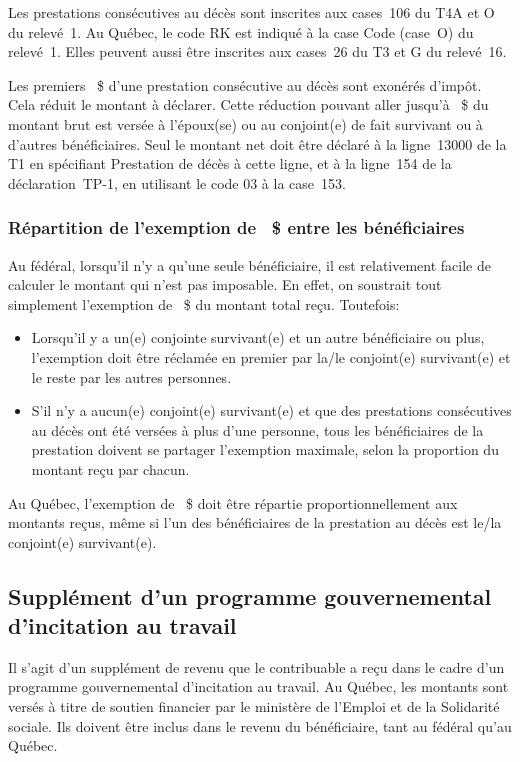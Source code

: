 Les prestations consécutives au décès sont inscrites aux cases~106 du T4A et O du relevé~1. Au Québec, le code \og RK \fg{} est indiqué à la case Code (case~O) du relevé~1. Elles peuvent aussi être inscrites aux cases~26 du T3 et G du relevé~16.

Les premiers ~\$ d'une prestation consécutive au décès sont exonérés d'impôt. Cela réduit le montant à déclarer. Cette réduction pouvant aller jusqu'à ~\$ du montant brut est versée à l'époux(se) ou au conjoint(e) de fait survivant ou à d'autres bénéficiaires. Seul le montant net doit être déclaré à la ligne~13000 de la T1 en spécifiant \og Prestation de décès \fg{} à cette ligne, et à la ligne~154 de la déclaration~TP-1, en utilisant le code 03 à la case~153. 

\subsubsection{Répartition de l'exemption de ~\$ entre les bénéficiaires}
Au fédéral, lorsqu'il n'y a qu'une seule bénéficiaire, il est relativement facile de calculer le montant qui n'est pas imposable. En effet, on soustrait tout simplement l'exemption de ~\$ du montant total reçu. Toutefois:

\begin{itemize}
	\item Lorsqu'il y a un(e) conjointe survivant(e) et un autre bénéficiaire ou plus, l'exemption doit être réclamée en premier par la/le conjoint(e) survivant(e) et le reste par les autres personnes.
	\item S'il n'y a aucun(e) conjoint(e) survivant(e) et que des prestations consécutives au décès ont été versées à plus d'une personne, tous les bénéficiaires de la prestation doivent se partager l'exemption maximale, selon la proportion du montant reçu par chacun.
\end{itemize}

Au Québec, l'exemption de ~\$ doit être répartie proportionnellement aux montants reçus, même si l'un des bénéficiaires de la prestation au décès est le/la conjoint(e) survivant(e).


\subsection{Supplément d'un programme gouvernemental d'incitation au travail}
Il s'agit d'un supplément de revenu que le contribuable a reçu dans le cadre d'un programme gouvernemental d'incitation au travail. Au Québec, les montants sont versés à titre de soutien financier par le ministère de l'Emploi et de la Solidarité sociale. Ils doivent être inclus dans le revenu du bénéficiaire, tant au fédéral qu'au Québec. 

